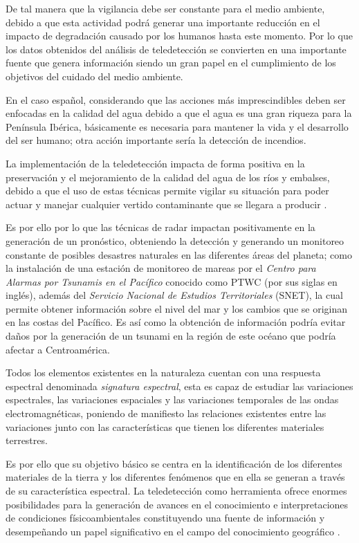 De tal manera que la vigilancia debe ser constante para el medio ambiente, debido a que esta actividad podrá generar una importante reducción en el impacto de degradación causado por los humanos hasta este momento. Por lo que los datos obtenidos del análisis de teledetección se convierten en una importante fuente que genera información siendo un gran papel en el cumplimiento de los objetivos del cuidado del medio ambiente.

En el caso español, considerando que las acciones más imprescindibles deben ser enfocadas en la calidad del agua debido a que el agua es una gran riqueza para la Península Ibérica, básicamente es necesaria para mantener la vida y el desarrollo del ser humano; otra acción importante sería la detección de incendios.

La implementación de la teledetección impacta de forma positiva en la preservación y el mejoramiento de la calidad del agua de los ríos y embalses, debido a que el uso de estas técnicas permite vigilar su situación para poder actuar y manejar cualquier vertido contaminante que se llegara a producir \cite{Rosello2009}.

Es por ello por lo que las técnicas de radar impactan positivamente en la generación de un pronóstico, obteniendo la detección y generando un monitoreo constante de posibles desastres naturales en las diferentes áreas del planeta; como la instalación de una estación de monitoreo de mareas por el \textit{Centro para Alarmas por Tsunamis en el Pacífico} conocido como PTWC (por sus siglas en inglés), además del \textit{Servicio Nacional de Estudios Territoriales} (SNET), la cual permite obtener información sobre el nivel del mar y los cambios que se originan en las costas del Pacífico. Es así como la obtención de información podría evitar daños por la generación de un tsunami en la región de este océano que podría afectar a Centroamérica.

Todos los elementos existentes en la naturaleza cuentan con una respuesta espectral denominada \textit{signatura espectral}, esta es capaz de estudiar las variaciones espectrales, las variaciones espaciales y las variaciones temporales de las ondas electromagnéticas, poniendo de manifiesto las relaciones existentes entre las variaciones junto con las características que tienen los diferentes materiales terrestres. 

Es por ello que su objetivo básico se centra en la identificación de los diferentes materiales de la tierra y los diferentes fenómenos que en ella se generan a través de su característica espectral. La teledetección como herramienta ofrece enormes posibilidades para la generación de avances en el conocimiento e interpretaciones de condiciones físicoambientales constituyendo una fuente de información y desempeñando un papel significativo en el campo del conocimiento geográfico \cite{Botana2019}. 

